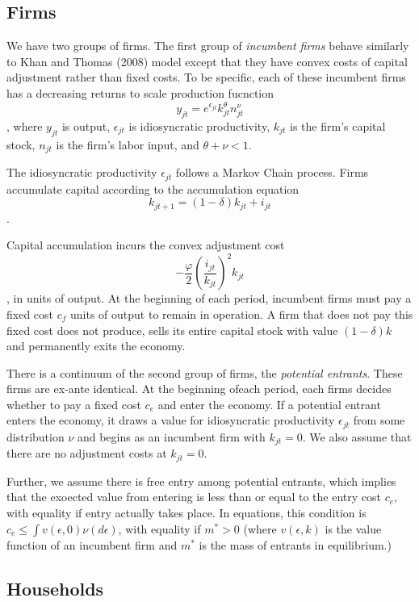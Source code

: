 \documentclass[]{article}
\begin{document}
\subsection{Firms}
We have two groups of firms. The first group of \textit{incumbent firms} behave similarly to Khan and Thomas (2008) model except that they have convex costs of capital adjustment rather than fixed costs. To be specific, each of these incumbent firms has a decreasing returns to scale production fucnction $$y_{jt}=e^{\epsilon_{jt}}k_{jt}^{\theta}n_{jt}^\nu$$, where $y_{jt}$ is output, $\epsilon_{jt}$ is idiosyncratic productivity, $k_{jt}$ is the firm's capital stock, $n_{jt}$ is the firm's labor input, and $\theta+\nu < 1$.

The idiosyncratic productivity $\epsilon_{jt}$ follows a Markov Chain process. Firms accumulate capital according to the accumulation equation $$k_{jt+1}=(1-\delta)k_{jt}+i_{jt}$$.

Capital accumulation incurs the convex adjustment cost $$-\frac{\varphi}{2} (\frac {i_{jt}}{k_{jt}})^2 k_{jt}$$, in units of output. At the beginning of each period, incumbent firms must pay a fixed cost $c_{f}$ units of output to remain in operation. A firm that does not pay this fixed cost does not produce, sells its entire capital stock with value $(1-\delta)k$ and permanently exits the economy.

There is a continuum of the second group of firms, the \textit{potential entrants}. These firms are ex-ante identical. At the beginning ofeach period, each firms decides whether to pay a fixed cost $c_{e}$ and enter the economy. If a potential entrant enters the economy, it draws a value for idiosyncratic productivity $\epsilon_{jt}$ from some distribution $\nu$ and begins as an incumbent firm with $k_{jt}=$0. We also assume that there are no adjustment costs at $k_{jt}=0$.

Further, we assume there is free entry among potential entrants, which implies that the exoected value from entering is less than or equal to the entry cost $c_{e}$, with equality if entry actually takes place. In equations, this condition is $c_{e} \leq \int v(\epsilon,0)\nu(d\epsilon)$, with equality if $m^{*} > 0$ (where $v(\epsilon,k)$ is the value function of an incumbent firm and $m^{*}$ is the mass of entrants in equilibrium.)



\subsection{Households}
\end{document}
